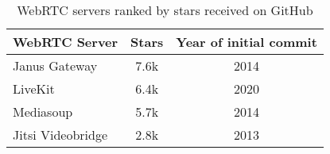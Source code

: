 \begin{table}[ht]
\centering
\caption{WebRTC servers ranked by stars received on GitHub}
\label{tab:githubStarsRankingWebRTC}
\begin{tabular}[t]{lcc}
\toprule
WebRTC Server & Stars & Year of initial commit\\
\midrule
Janus Gateway & 7.6k & 2014\\
LiveKit & 6.4k & 2020\\
Mediasoup & 5.7k & 2014\\
Jitsi Videobridge & 2.8k & 2013\\
\bottomrule
\end{tabular}
\end{table}
